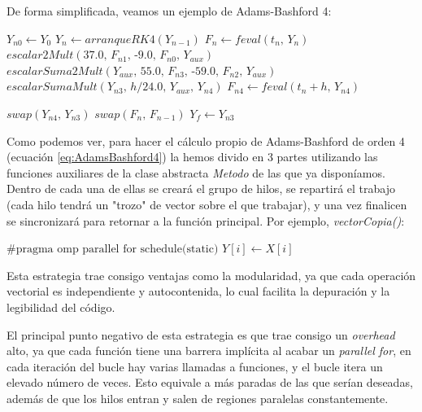 De forma simplificada, veamos un ejemplo de Adams-Bashford 4:

\begin{algorithm}[H]
	\begin{algorithmic}
		\State $ Y_{n0} \gets Y_0 $
		\State $ Y_n \gets arranqueRK4(Y_{n-1})$ 
		\State $ F_n \gets feval(t_n\text{, }Y_n)$ 
			\State $ escalar2Mult(37.0\text{, }F_{n1}\text{, -}9.0\text{, }F_{n0}\text{, }Y_{aux}) $
			\State $ escalarSuma2Mult( Y_{aux}\text{, }55.0\text{, }F_{n3}\text{, -}59.0\text{, }F_{n2}\text{, }Y_{aux} ) $
			\State $ escalarSumaMult( Y_{n3}\text{, }h/24.0\text{, }Y_{aux}\text{, }Y_{n4} ) $
			\State $ F_{n4} \gets feval(t_n+h\text{, }Y_{n4}) $
			
			\State $ swap(Y_{n4}\text{, }Y_{n3}) $
			\State $ swap(F_n\text{, }F_{n-1}) $ 
		\EndFor
		\State $Y_f \gets Y_{n3}$
	\end{algorithmic}
	\caption{Implementación de AB4 con Paralelismo por Operaciones}
	\label{alg:AB4ParalelismoOperaciones}
\end{algorithm}

Como podemos ver, para hacer el cálculo propio de Adams-Bashford de orden 4 (ecuación \ref{eq:AdamsBashford4}) la hemos divido en 3 partes utilizando las funciones auxiliares de la clase abstracta \textit{Metodo} de las que ya disponíamos. Dentro de cada una de ellas se creará el grupo de hilos, se repartirá el trabajo (cada hilo tendrá un "trozo" de vector sobre el que trabajar), y una vez finalicen se sincronizará para retornar a la función principal. Por ejemplo, \textit{vectorCopia()}:
\begin{algorithm}[H]
	\begin{algorithmic}
		\State $ \text{\#pragma omp parallel for schedule(static)} $
		\For{ $ i \text{=} 0 \text{; }i < neqn\text{; }\text{++}i $ }
			\State $ Y[i] \gets X[i] $
		\EndFor
		
	\end{algorithmic}
	\caption{Implementación de Función Auxiliar}
	\label{alg:VectorCopia}
\end{algorithm}

Esta estrategia trae consigo ventajas como la modularidad, ya que cada operación vectorial es independiente y autocontenida, lo cual facilita la depuración y la legibilidad del código.

El principal punto negativo de esta estrategia es que trae consigo un \textit{overhead} alto, ya que cada función tiene una barrera implícita al acabar un \textit{parallel for}, en cada iteración del bucle hay varias llamadas a funciones, y el bucle itera un elevado número de veces. Esto equivale a más paradas de las que serían deseadas, además de que los hilos entran y salen de regiones paralelas constantemente.

